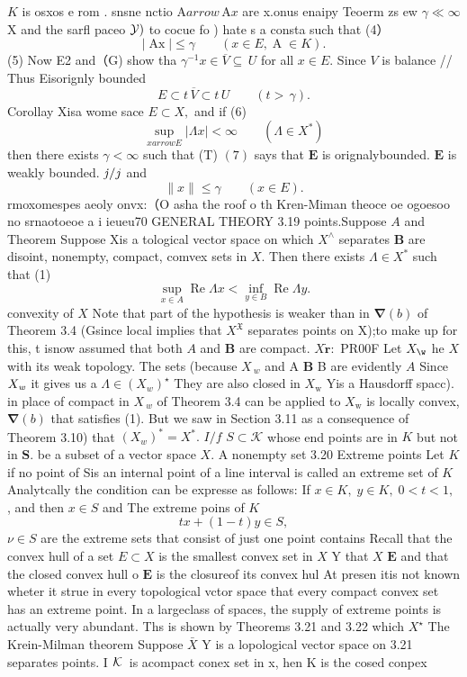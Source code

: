 $K$ is osxos e rom . snsne nctio $\mathrm{A}{ arrow}\,\mathrm{A}x$ are x.onus enaipy Teoerm zs ew $\gamma\ll\infty$ X and the sarfl paceo ${\cal{Y}})$ to cocue fo ) hate s a consta such that (4） $$ |\operatorname{Ax}|\leq\gamma\qquad(x\in E,\operatorname{A}\in K). $$ (5) Now E2 and（G) show tha $\gamma^{-1}x\in\overline{{{V}}}\subseteq\,U$ for all $x\in E.$ Since ${\mathbf{}}V$ is balance // Thus Eisorignly bounded $$ E\subset t\,\overline{{{V}}}\subset t\,U\qquad(t>\,{\gamma}). $$ Corollay Xisa wome sace $E\subset X,$ and if (6) $$ \operatorname*{sup}_{x arrow E}|\Lambda x|<\infty\qquad(\Lambda\in X^{*}) $$ then there exists $\gamma<\infty$ such that (T) $(7)$ says that ${\boldsymbol{E}}$ is orignalybounded. $\boldsymbol{E}$ is weakly bounded. ${\it j}/j$ and $$ \|x\|\leq\gamma\qquad(x\in E). $$ rmoxomespes aeoly onvx:（O asha the roof o th Kren-Miman theoce oe ogoesoo no srnaotoeoe a i ieueu70 GENERAL THEORY 3.19 points.Suppose $\scriptstyle A$ and Theorem Suppose Xis a tological vector space on which $X^{\wedge}$ separates $\boldsymbol{B}$ are disoint, nonempty, compact, comvex sets in $X.$ Then there exists $\Lambda\in X^{*}$ such that (1) $$ \operatorname*{sup}_{x\in A}\operatorname{Re}\Lambda x<\operatorname*{inf}_{y\in B}\operatorname{Re}\Lambda y. $$ convexity of $\textstyle X$ Note that part of the hypothesis is weaker than in $\mathbf{\nabla}(b)$ of Theorem 3.4 (Gsince local implies that $X^{\mathfrak{X}}$ separates points on X);to make up for this, t isnow assumed that both $\textstyle A$ and $\boldsymbol{B}$ are compact. $X{\dot{\boldsymbol{r}}}:$ PR00F Let $X_{\w}$ he $\textstyle X$ with its weak topology. The sets (because $X_{\ w}$ and A $\boldsymbol{B}$ B are evidently $\textstyle A$ Since $X_{\it w}$ it gives us a $\Lambda\in(X_{w})^{\star}$ They are also closed in $X_{\mathrm{w}}$ Yis a Hausdorff spacc). in place of compact in $\textstyle X_{\ w}$ of Theorem 3.4 can be applied to $X_{\mathrm{w}}$ is locally convex, $\mathbf{\nabla}(b)$ that satisfies (1). But we saw in Section 3.11 as a consequence of Theorem 3.10) that $(X_{w})^{*}=X^{*}.$ $I/f$ $S\subset{\mathcal{K}}$ whose end points are in $\textstyle K$ but not in $\mathbf{S}.$ be a subset of a vector space $X.$ A nonempty set 3.20 Extreme points Let $\textstyle K$ if no point of Sis an internal point of a line interval is called an extreme set of $K$ Analytcally the condition can be expresse as follows: If $x\in K,\;y\in K,\;0<t<1,$ , and then $x\in S$ and The extreme poins of $\textstyle K$ $$ t x+(1-t)y\in S, $$ $\nu\in S$ are the extreme sets that consist of just one point contains Recall that the convex hull of a set $E\subset X$ is the smallest convex set in $\textstyle X$ Y that $\textstyle{X}$ ${\boldsymbol{E}}$ and that the closed convex hull o $\boldsymbol{E}$ is the closureof its convex hul At presen itis not known wheter it strue in every topological vctor space that every compact convex set has an extreme point. In a largeclass of spaces, the supply of extreme points is actually very abundant. Ths is shown by Theorems 3.21 and 3.22 which $X^{\star}$ The Krein-Milman theorem Suppose $\textstyle{\bar{X}}$ Y is a lopological vector space on 3.21 separates points. I ${\cal K}\,$ is acompact conex set in x, hen K is the cosed conpex 
